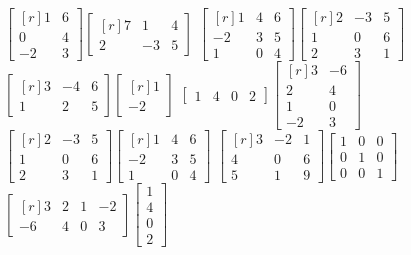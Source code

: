 \begin{tasks}[
    start=19,
    style=enumerate,
    label-offset = 2.9mm,
    ]
    \task $\begin{bmatrix*}[r]1 & 6 \\ 0 & 4 \\ -2 & 3\end{bmatrix*}\begin{bmatrix*}[r]7 & 1 & 4 \\ 2 & -3 & 5\end{bmatrix*}$
    \task $\begin{bmatrix*}[r]1 & 4 & 6 \\ -2 & 3 & 5 \\ 1 & 0 & 4\end{bmatrix*}\begin{bmatrix*}[r]2 & -3 & 5 \\ 1 & 0 & 6 \\ 2 & 3 & 1\end{bmatrix*}$
    \task $\begin{bmatrix*}[r]3 & -4 & 6 \\ 1 & 2 & 5\end{bmatrix*}\begin{bmatrix*}[r]1 \\ -2\end{bmatrix*}$
    \task $\begin{bmatrix*}1 & 4 & 0 & 2\end{bmatrix*}\begin{bmatrix*}[r]3 & -6 \\ 2 & 4 \\ 1 & 0 \\ -2 & 3\end{bmatrix*}$
    \task $\begin{bmatrix*}[r]2 & -3 & 5 \\ 1 & 0 & 6 \\ 2 & 3 & 1\end{bmatrix*}\begin{bmatrix*}[r]1 & 4 & 6 \\ -2 & 3 & 5 \\ 1 & 0 & 4\end{bmatrix*}$
    \task $\begin{bmatrix*}[r]3 & -2 & 1 \\ 4 & 0 & 6 \\ 5 & 1 & 9\end{bmatrix*}\begin{bmatrix*}1 & 0 & 0 \\ 0 & 1 & 0 \\ 0 & 0 & 1\end{bmatrix*}$
    \task $\begin{bmatrix*}[r]3 & 2 & 1 & -2 \\ -6 & 4 & 0 & 3\end{bmatrix*}\begin{bmatrix*}1 \\ 4 \\ 0 \\ 2\end{bmatrix*}$\newpage

\end{tasks}
